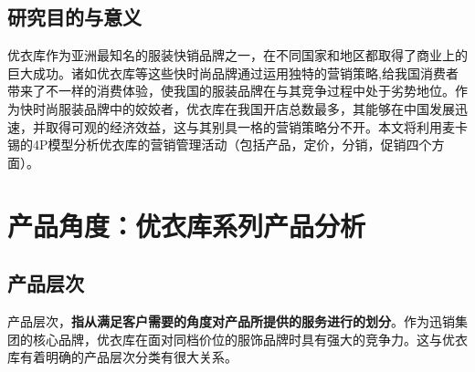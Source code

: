 \documentclass{xjtureport}
\begin{document}
\subsection{研究目的与意义}
优衣库作为亚洲最知名的服装快销品牌之一，在不同国家和地区都取得了商业上的巨大成功。诸如优衣库等这些快时尚品牌通过运用独特的营销策略,给我国消费者带来了不一样的消费体验，使我国的服装品牌在与其竞争过程中处于劣势地位。作为快时尚服装品牌中的姣姣者，优衣库在我国开店总数最多，其能够在中国发展迅速，并取得可观的经济效益，这与其别具一格的营销策略分不开。本文将利用麦卡锡的4P模型分析优衣库的营销管理活动（包括产品，定价，分销，促销四个方面）。
\section{产品角度：优衣库系列产品分析}
\subsection{产品层次}
产品层次，\textbf{指从满足客户需要的角度对产品所提供的服务进行的划分}。作为迅销集团的核心品牌，优衣库在面对同档价位的服饰品牌时具有强大的竞争力。这与优衣库有着明确的产品层次分类有很大关系。
\end{document}
